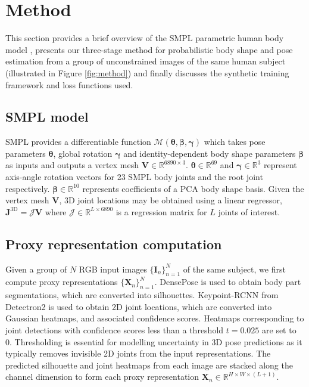 \documentclass[final]{cvpr}
\begin{document}
\section{Method}

This section provides a brief overview of the SMPL parametric human body model  \cite{SMPL:2015}, presents our three-stage method for probabilistic body shape and pose estimation from a group of unconstrained images of the same human subject (illustrated in Figure \ref{fig:method}) and finally discusses the synthetic training framework and loss functions used.

\subsection{SMPL model}

SMPL \cite{SMPL:2015} provides a differentiable function $\mathcal{M}(\boldsymbol{\theta}, \boldsymbol{\beta}, \boldsymbol{\gamma})$ which takes pose parameters $\boldsymbol{\theta}$, global rotation $\boldsymbol{\gamma}$ and identity-dependent body shape parameters $\boldsymbol{\beta}$ as inputs and outputs a vertex mesh $\mathbf{V} \in \mathbb{R}^{6890 \times 3}$. $\boldsymbol{\theta} \in \mathbb{R}^{69}$ and $\boldsymbol{\gamma} \in \mathbb{R}^3$ represent axis-angle rotation vectors for 23 SMPL body joints and the root joint respectively. $\boldsymbol{\beta} \in \mathbb{R}^{10}$ represents coefficients of a PCA body shape basis. Given the vertex mesh $\mathbf{V}$, 3D joint locations may be obtained using a linear regressor, $\mathbf{J}^{\text{3D}} = \mathcal{J}\mathbf{V}$ where $\mathcal{J} \in \mathbb{R}^{L \times 6890}$ is a regression matrix for $L$ joints of interest.

\subsection{Proxy representation computation}

Given a group of $N$ RGB input images $\{\mathbf{I}_n\}_{n=1}^N$ of the same subject, we first compute proxy representations $\{\mathbf{X}_n\}_{n=1}^N$. DensePose \cite{Guler2018DensePose} is used to obtain body part segmentations, which are converted into silhouettes. Keypoint-RCNN from Detectron2 \cite{he2017maskrcnn, wu2019detectron2} is used to obtain 2D joint locations, which are converted into Gaussian heatmaps, and associated confidence scores. Heatmaps corresponding to joint detections with confidence scores less than a threshold $t=0.025$ are set to 0. Thresholding is essential for modelling uncertainty in 3D pose predictions as it typically removes invisible 2D joints from the input representations. The predicted silhouette and joint heatmaps from each image are stacked along the channel dimension to form each proxy representation $\mathbf{X}_n \in \mathbb{R}^{H \times W \times (L+1)}$.
\end{document}
